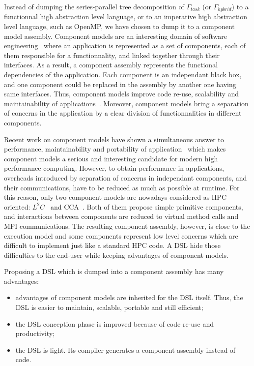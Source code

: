 Instead of dumping the series-parallel tree decomposition of $\Gamma_{task}$ (or $\Gamma_{hybrid}$) to a functionnal high abstraction level language, or to an imperative high abstraction level language, such as OpenMP, we have chosen to dump it to a component model assembly. Component models are an interesting domain of software engineering~\cite{Szyperski:2002:CSB:515228} where an application is represented as a set of components, each of them responsible for a functionnality, and linked together through their interfaces. As a result, a component assembly represents the functional dependencies of the application. Each component is an independant black box, and one component could be replaced in the assembly by another one having same interfaces. Thus, component models improve code re-use, scalability and maintainability of applications~\cite{Szyperski:2002:CSB:515228,bigot:inria-00388508}. Moreover, component models bring a separation of concerns in the application by a clear division of functionnalities in different components.

Recent work on component models have shown a simultaneous answer to performance, maintainability and portability of application~\cite{l2c} which makes component models a serious and interesting candidate for modern high performance computing. However, to obtain performance in applications, overheads introduced by separation of concerns in independant components, and their communications, have to be reduced as much as possible at runtime. For this reason, only two component models are nowadays considered as HPC-oriented: $L^2C$~\cite{l2c} and CCA~\cite{Allan04acomponent}. Both of them propose simple primitive components, and interactions between components are reduced to virtual method calls and MPI communications. The resulting component assembly, however, is close to the execution model and some components represent low level concerns which are difficult to implement just like a standard HPC code. A DSL hide those difficulties to the end-user while keeping advantages of component models.

Proposing a DSL which is dumped into a component assembly has many advantages:
\begin{itemize}
\item advantages of component models are inherited for the DSL itself. Thus, the DSL is easier to maintain, scalable, portable and still efficient;
\item the DSL conception phase is improved because of code re-use and productivity;
\item the DSL is light. Its compiler generates a component assembly instead of code.
\end{itemize}


